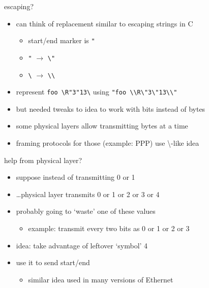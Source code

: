
\begin{frame}[fragile]{escaping?}
    \begin{itemize}
    \item can think of replacement similar to escaping strings in C
        \begin{itemize}
        \item start/end marker is \verb|"|
        \item \verb|"| $\rightarrow$ \verb|\"|
        \item \verb|\| $\rightarrow$ \verb|\\|
        \end{itemize}
    \item represent \verb|foo \R"3"13\| using \verb|"foo \\R\"3\"13\\"|
    \item but needed tweaks to idea to work with bits instead of bytes
    \vspace{.5cm}
    \item<2-> some physical layers allow transmitting bytes at a time
    \item<2-> framing protocols for those (example: PPP) use \textbackslash-like idea
    \end{itemize}
\end{frame}

\begin{frame}{help from physical layer?}
    \begin{itemize}
    \item suppose instead of transmitting 0 or 1
    \item \ldots physical layer transmits 0 or 1 or 2 or 3 or 4
    \item probably going to `waste' one of these values
        \begin{itemize}
        \item example: transmit every two bits as 0 or 1 or 2 or 3
        \end{itemize}
    \vspace{.5cm}
    \item<2-> idea: take advantage of leftover `symbol' 4
    \item<2-> use it to send start/end
        \begin{itemize}
        \item similar idea used in many versions of Ethernet
        \end{itemize}
    \end{itemize}
\end{frame}
